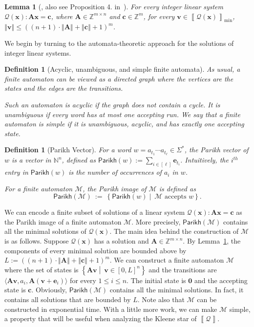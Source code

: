 \documentclass[10pt,a4paper]{article}
\newtheorem{lemma}[theorem]{Lemma}
\newtheorem{definition}[theorem]{Definition}
\theoremstyle{definition}
\theoremstyle{remark}
\newcommand{\cM}{\mathcal{M}}
\newcommand{\cQ}{\mathcal{Q}}
\newcommand{\bbN}{\mathbb{N}}
\newcommand{\bbZ}{\mathbb{Z}}
\newcommand{\bfA}{\mathbf{A}}
\newcommand{\bfc}{\mathbf{c}}
\newcommand{\bfe}{\mathbf{e}}
\newcommand{\bfv}{\mathbf{v}}
\newcommand{\bfx}{\mathbf{x}}
\newcommand{\bfzero}{\mathbf{0}}
\newcommand{\setc}[2]        {\left\{ #1 \middle|\  #2 \right\}}
\newcommand{\intsinterval}[1]{{\left[ #1 \right]}}
\newcommand{\norm}[1]        {\left\Vert #1 \right\Vert}
\newcommand{\parikh}[1] {\mathsf{Parikh}\left( #1 \right)}
\newcommand{\sol}[1] {\left\llbracket #1 \right\rrbracket}
\newcommand{\solmin}[1] {\left\llbracket #1 \right\rrbracket_\text{min}}
\newcommand{\unit}[1] {\bfe_{ #1 }}
\begin{document}
\begin{lemma}[\cite{Pottier}, also see Proposition 4. in~\cite{semilinear}]\label{lem:minimal}
    For every integer linear system $\cQ(\bfx): \bfA \bfx = \bfc$,
    where $\bfA \in \bbZ^{m \times n}$ and $\bfc \in \bbZ^{m}$,
    for every $\bfv \in \solmin{\cQ(\bfx)}$,
     $\norm{\bfv} \le \left((n+1)\cdot\norm{\bfA} + \norm{\bfc} + 1\right)^{m}$.
\end{lemma}

We begin by turning to the automata-theoretic approach for the solutions of integer linear systems.

\begin{definition}[Acyclic, unambiguous, and simple finite automata] \label{def:simpleplus}
As usual, a finite automaton can be viewed as a 
directed graph where the vertices are the states
and the edges are the transitions.

Such an automaton is \emph{acyclic} if the graph does not contain a cycle. 
It is \emph{unambiguous} if every word has 
at most one accepting run.
    We say that a finite automaton is \emph{simple}
    if it is unambiguous, acyclic, and has exactly one accepting state.
\end{definition}

\begin{definition}[Parikh Vector]
    For a word $w = a_{t_1}\cdots a_{t_\ell} \in \Sigma^*$,
    the \emph{Parikh vector} of $w$
    is a vector in $\bbN^{n}$, defined as
    $\parikh{w} := \sum_{i \in \intsinterval{\ell}} \unit{t_i}$.
    Intuitively, the $i^{th}$ entry in $\parikh{w}$ is the number of occurrences of $a_i$ in $w$.

For a finite automaton $\cM$, the \emph{Parikh image} of $\cM$ is defined as
\begin{equation*}
\parikh{\cM}
\ :=\ 
\setc{\parikh{w}}{\text{$\cM$ accepts $w$}}.
\end{equation*}
\end{definition}

We can encode a finite subset of solutions of a linear system $\cQ(\bfx):\bfA \bfx = \bfc$ as the Parikh image of a finite automaton $\cM$.
More precisely, $\parikh{\cM}$ contains all the minimal solutions of $\cQ(\bfx)$.
The main idea behind the construction of $\cM$ is as follows.
Suppose $\cQ(\bfx)$ has a solution
and $\bfA\in \bbZ^{m\times n}$.
By Lemma~\ref{lem:minimal},
the components of every minimal solution are bounded above by  
$L:=\left((n+1)\cdot\norm{\bfA} + \norm{\bfc} + 1\right)^{m}$.
We can construct a finite automaton $\cM$ where the set of states is $\setc{\bfA\bfv}{\bfv \in [0,L]^n}$
and the transitions are
$\langle \bfA\bfv,a_i, \bfA(\bfv+\bfe_i) \rangle$ for every $1\le i \le n$.
The initial state is $\bfzero$ and the accepting state is $\bfc$.
Obviously, $\parikh{\cM}$ contains all the minimal solutions. In fact, it contains all solutions that are bounded by $L$. 
Note also that
$\cM$ can be constructed in exponential time.
With a little more work, we can make $\cM$ simple, a property that will be useful when analyzing the Kleene star of $\sol{\cQ}$.
\end{document}

